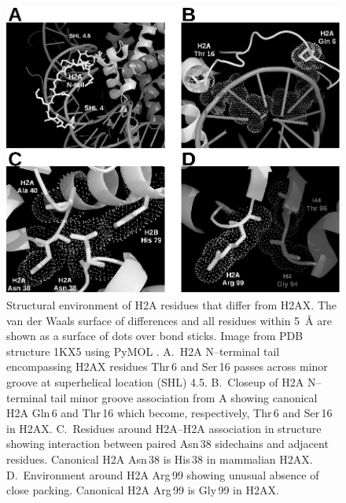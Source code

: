 \begin{figure}
\includegraphics{Fig5}
\caption{Structural environment of H2A residues that differ from H2AX\@. The van der Waals surface
of differences and all residues within \SI{5}{\angstrom} are shown as a surface of dots over bond sticks. Image
from PDB structure 1KX5 using PyMOL \protect\citep{DeL02}. A.~H2A N--terminal tail encompassing H2AX
residues Thr\,6 and Ser\,16 passes across minor groove at superhelical location (SHL) 4.5\@. B.~Closeup
of H2A N--terminal tail minor groove association from A showing canonical H2A Gln\,6 and Thr\,16 which
become, respectively, Thr\,6 and Ser\,16 in H2AX\@. C.~Residues around H2A--H2A association in structure
showing interaction between paired Asn\,38 sidechains and adjacent residues. Canonical H2A Asn\,38 is
His\,38 in mammalian H2AX\@. D.~Environment around H2A Arg\,99 showing unusual absence of close packing.
Canonical H2A Arg\,99 is Gly\,99 in H2AX.}
\label{fig:h2ax-review:framed}
\end{figure}

